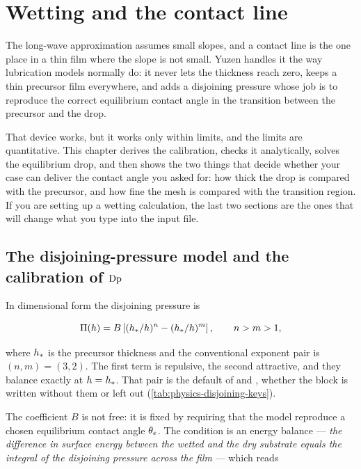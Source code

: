 \chapter{Wetting and the contact line}
\label{ch:wetting}

The long-wave approximation assumes small slopes, and a contact line is the one
place in a thin film where the slope is not small. Yuzen handles it the way
lubrication models normally do: it never lets the thickness reach zero, keeps a
thin precursor film everywhere, and adds a disjoining pressure whose job is to
reproduce the correct equilibrium contact angle in the transition between the
precursor and the drop.

That device works, but it works only within limits, and the limits are
quantitative. This chapter derives the calibration, checks it analytically,
solves the equilibrium drop, and then shows the two things that decide whether
your case can deliver the contact angle you asked for: how thick the drop is
compared with the precursor, and how fine the mesh is compared with the
transition region. If you are setting up a wetting calculation, the last two
sections are the ones that will change what you type into the input file.

\section{The disjoining-pressure model and the calibration of \texorpdfstring{$\mathrm{Dp}$}{Dp}}
\label{sec:wetting:dp}

In dimensional form the disjoining pressure is

\begin{equation}\label{eq:pi-dim}
  \Pi(h) = B \left[ (h_{*}/h)^{n} - (h_{*}/h)^{m} \right],
  \qquad n > m > 1,
\end{equation}

where $h_{*}$ is the precursor thickness and the conventional exponent pair is
$(n,m) = (3,2)$. The first term is repulsive, the second attractive, and they
balance exactly at $h = h_{*}$. That pair is the default of
 and , whether the
 block is written without them or left out
(\cref{tab:physics-disjoining-keys}).

The coefficient $B$ is not free: it is fixed by requiring that the model
reproduce a chosen equilibrium contact angle $\theta_{e}$. The condition is an
energy balance --- \emph{the difference in surface energy between the wetted
and the dry substrate equals the integral of the disjoining pressure across the
film} --- which reads

